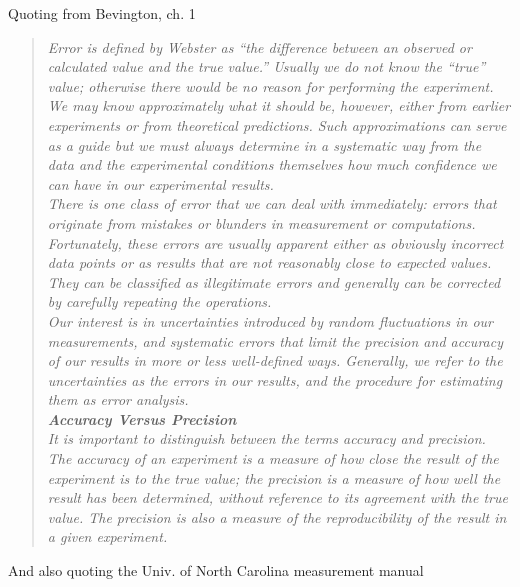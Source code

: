 \documentclass[12pt]{article}
\begin{document}
\noindent Quoting from Bevington, ch. 1
\begin{quote}
\it Error \rm is defined by Webster as ``the difference between an observed or calculated value and the true value.''
Usually we do not know the ``true'' value; otherwise there would be no reason for performing the experiment. We may know approximately what it should be, however, either from earlier experiments or from theoretical predictions. Such approximations can serve as a guide but we must always determine in a systematic way from the data and the experimental conditions themselves how much confidence we can have in our experimental results.\\

\noindent There is one class of error that we can deal with immediately: errors that originate from mistakes or blunders in measurement or computations. Fortunately, these errors are usually apparent either as obviously incorrect data points or as results that are not reasonably close to expected values. They can be classified as \it illegitimate errors \rm and generally can be corrected by carefully repeating the operations.\\

\noindent Our interest is in \it uncertainties \rm introduced by random fluctuations in our measurements, and \it systematic errors \rm that limit the precision and accuracy of our results in more or less well-defined ways. Generally, we refer to the uncertainties as the \it errors \rm in our results, and the procedure for estimating them as \it 
error analysis.\rm \\
\newpage
\noindent \textbf{Accuracy Versus Precision} \\

\noindent It is important to distinguish between the terms \it accuracy \rm and \it precision. \rm The accuracy of an experiment is a measure of how close the result of the experiment is to the true value; the precision is a measure of how well the result has been determined, without reference to its agreement with the true value. The precision is also a measure of the reproducibility of the result in a given experiment.
\end{quote}  
And also quoting the Univ. of North Carolina measurement manual
\end{document}
